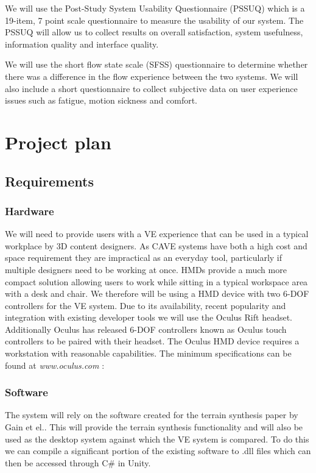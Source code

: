 \documentclass{sig-alternate-05-2015}
\begin{document}
We will use the Post-Study System Usability Questionnaire (PSSUQ) which is a 19-item, 7 point scale questionnaire\cite{Lewis1995} to measure the usability of our system. The PSSUQ will allow us to collect results on overall satisfaction, system usefulness, information quality and interface quality.

We will use the short flow state scale (SFSS) questionnaire\cite{jackson2009flow} to determine whether there was a difference in the flow experience between the two systems. We will also include a short questionnaire to collect subjective data on user experience issues such as fatigue, motion sickness and comfort.

\section{Project plan}
\subsection{Requirements}
\subsubsection{Hardware}
We will need to provide users with a VE experience that can be used in a typical workplace by 3D content designers. As CAVE systems have both a high cost and space requirement they are impractical as an everyday tool, particularly if multiple designers need to be working at once. HMDs provide a much more compact solution allowing users to work while sitting in a typical workspace area with a desk and chair. We therefore will be using a HMD device with two 6-DOF controllers for the VE system. Due to its availability, recent popularity and integration with existing developer tools we will use the Oculus Rift headset. Additionally Oculus has released 6-DOF controllers known as Oculus touch controllers to be paired with their headset\cite{Oculus}. The Oculus HMD device requires a workstation with reasonable capabilities. The minimum specifications can be found at \textit{www.oculus.com} \cite{Oculus}:
\subsubsection{Software}
The system will rely on the software created for the terrain synthesis paper by Gain et el.\cite{Gain2015}. This will provide the terrain synthesis functionality and will also be used as the desktop system against which the VE system is compared. To do this we can compile a significant portion of the existing software to .dll files which can then be accessed through C\# in Unity. 
\end{document}
